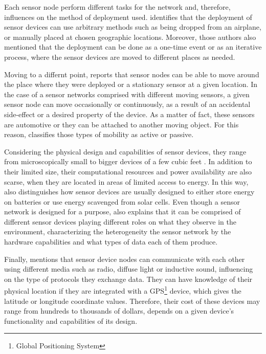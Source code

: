 Each sensor node perform different tasks for the network and, therefore,
influences on the method of deployment used. \cite{sn-intro01} identifies that
the deployment of sensor devices can use arbitrary methods such as being
dropped from an airplane, or manually placed at chosen geographic locations.
Moreover, those authors also mentioned that the deployment can be done as a
one-time event or as an iterative process, where the sensor devices are moved
to different places as needed.

Moving to a differnt point, \cite{sn-intro01} reports that sensor nodes can be
able to move around the place where they were deployed or a stationary sensor
at a given location. In the case of a sensor networks comprised with different
moving sensors, a given sensor node can move occasionally or continuously, as
a result of an accidental side-effect or a desired property of the device. As
a matter of fact, these sensors are automotive or they can be attached to
another moving object. For this reason, \cite{sn-intro01} classifies those
types of mobility as active or passive.

Considering the physical design and capabilities of sensor devices, they range
from microscopically small to bigger devices of a few cubic feet
\cite{sn-intro02}. In addition to their limited size, their computational
resources and power availability are also scarse, when they are located in
areas of limited access to energy. In this way, \cite{sn-intro01} also
distinguishes how sensor devices are usually designed to either store energy on
batteries or use energy scavenged from solar cells. Even though a sensor
network is designed for a purpose, \cite{sn-intro01} also explains that it can
be comprised of different sensor devices playing different roles on what they
observe in the environment, characterizing the heterogeneity the sensor
network by the hardware capabilities and what types of data each of them
produce.

Finally, \cite{sn-intro01} mentions that sensor device nodes can communicate
with each other using different media such as radio, diffuse light or
inductive sound, influencing on the type of protocols they exchange data. They
can have knowledge of their physical location if they are integrated with a
GPS\footnote{Global Positioning System} device, which gives the latitude or
longitude coordinate values. Therefore, their cost of these devices may range
from hundreds to thousands of dollars, depends on a given device's functionality
and capabilities of its design.

